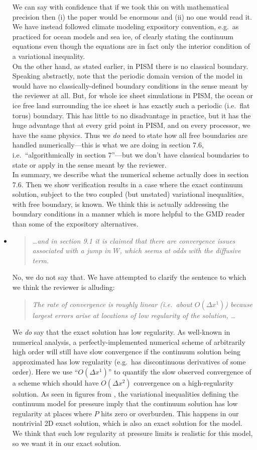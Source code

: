 \documentclass[11pt,reqno]{amsart}
\newcommand{\reply}[2]{
\medskip\medskip
\item  \begin{quote}
\emph{#1}
\end{quote}

\medskip
\noindent #2}
\begin{document}
\begin{itemize}
{\indent We can say with confidence that if we took this on with mathematical precision then (i) the paper would be enormous and (ii) no one would read it.  We have instead followed climate modeling expository convention, e.g.~as practiced for ocean models and sea ice, of clearly stating the continuum equations even though the equations are in fact only the interior condition of a variational inequality.\\
\indent On the other hand, as stated earlier, in PISM there is no classical boundary.  Speaking abstractly, note that the periodic domain version of the model in \cite{Schoofetal2012} would have no classically-defined boundary conditions in the sense meant by the reviewer at all.  But, for whole ice sheet simulations in PISM, the ocean or ice free land surrounding the ice sheet is has exactly such a periodic (i.e.~flat torus) boundary.  This has little to no disadvantage in practice, but it has the huge advantage that at every grid point in PISM, and on every processor, we have the same physics.  Thus we \emph{do} need to state how all free boundaries are handled numerically---this is what we are doing in section 7.6, i.e.~``algorithmically in section 7''---but we don't have classical boundaries to state or apply in the sense meant by the reviewer. \\
\indent In summary, we describe what the numerical scheme actually does in section 7.6.  Then we show verification results in a case where the exact continuum solution, subject to the two coupled (but unstated) variational inequalities, with free boundary, is known.  We think this is actually addressing the boundary conditions in a manner which is more helpful to the GMD reader than some of the expository alternatives.}

\reply{\dots and in section 9.1 it is claimed that there are convergence issues associated with a jump in $W$, which seems at odds with the diffusive term.}
{No, we do not say that.  We have attempted to clarify the sentence to which we think the reviewer is alluding:
\begin{quote}
\emph{The rate of convergence is roughly linear (i.e.~about $O(\Delta x^1)$) because largest errors arise at locations of low regularity of the solution, \dots}
\end{quote}
We \emph{do} say that the exact solution has low regularity.  As well-known in numerical analysis, a perfectly-implemented numerical scheme of arbitrarily high order will still have slow convergence if the continuum solution being approximated has low regularity (e.g.~has discontinuous derivatives of some order).  Here we use ``$O(\Delta x^1)$'' to quantify the slow observed convergence of a scheme which should have $O(\Delta x^2)$ convergence on a high-regularity solution.  As seen in figures from \cite[see Figure 9(a)]{Schoofetal2012}, the variational inequalities defining the continuum model for pressure imply that the continuum solution has low regularity at places where $P$ hits zero or overburden.  This happens in our nontrivial 2D exact solution, which is also an exact solution for the \cite{Schoofetal2012} model.  We think that such low regularity at pressure limits is realistic for this model, so we want it in our exact solution.}


\end{itemize}
\end{document}
